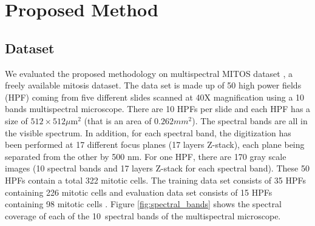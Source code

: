 \documentclass[10pt,twocolumn,letterpaper]{article}
\begin{document}
\section{Proposed Method}
\label{sec:framework}
\subsection{Dataset}
We evaluated the proposed methodology on multispectral MITOS dataset \cite{mITOS2012}, a freely available mitosis dataset. The data set is made up of 50 high power fields (HPF) coming from five different slides scanned at 40X magnification using a 10 bands multispectral microscope. There are 10 HPFs per slide and each HPF has a size of $512\times512\mu\text{m}^2$ (that is an area of $0.262mm^2$). The spectral bands are all in the visible spectrum. In addition, for each spectral band, the digitization has been performed at 17 different focus planes (17 layers Z-stack), each plane being separated from the other by 500 nm. For one HPF, there are 170 gray scale images (10 spectral bands and 17 layers Z-stack for each spectral band). These 50 HPFs contain a total 322 mitotic cells. The training data set consists of 35 HPFs containing 226 mitotic cells and evaluation data set consists of 15 HPFs containing 98 mitotic cells \cite{roux2013}. Figure \ref{fig:spectral_bands} shows the spectral coverage of each of the 10~spectral bands of the multispectral microscope.
\end{document}
